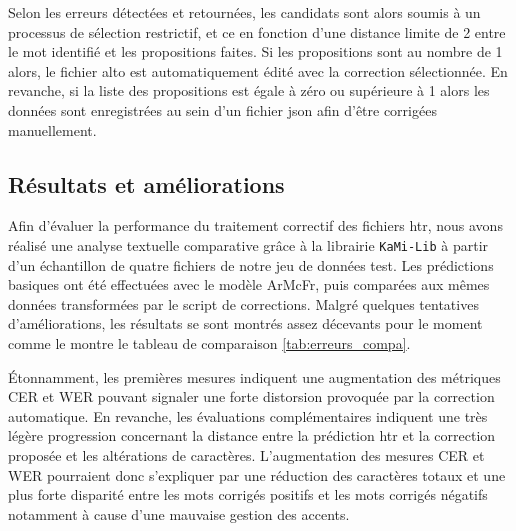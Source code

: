    Selon les erreurs détectées et retournées, les candidats sont alors soumis à un processus de sélection restrictif, et ce en fonction d'une distance limite de 2 entre le mot identifié et les propositions faites. Si les propositions sont au nombre de 1 alors, le fichier \gls{alto} est automatiquement édité avec la correction sélectionnée. En revanche, si la liste des propositions est égale à zéro ou supérieure à 1 alors les données sont enregistrées au sein d'un fichier \gls{json} afin d'être corrigées manuellement.
	
	\subsection{Résultats et améliorations}
	
	Afin d'évaluer la performance du traitement correctif des fichiers \gls{htr}, nous avons réalisé une analyse textuelle comparative grâce à la librairie \texttt{KaMi-Lib} à partir d'un échantillon de quatre fichiers de notre jeu de données test. Les prédictions basiques ont été effectuées avec le modèle ArMcFr, puis comparées aux mêmes données transformées par le script de corrections. Malgré quelques tentatives d'améliorations, les résultats se sont montrés assez décevants pour le moment comme le montre le tableau de comparaison \ref{tab:erreurs_compa}. 
	
	Étonnamment, les premières mesures indiquent une augmentation des métriques \gls{CER} et \gls{WER} pouvant signaler une forte distorsion provoquée par la correction automatique. En revanche, les évaluations complémentaires indiquent une très légère progression concernant la distance entre la prédiction \gls{htr} et la correction proposée et les altérations de caractères. L'augmentation des mesures \gls{CER} et \gls{WER} pourraient donc s'expliquer par une réduction des caractères totaux et une plus forte disparité entre les mots corrigés positifs et les mots corrigés négatifs notamment à cause d'une mauvaise gestion des accents.
	
